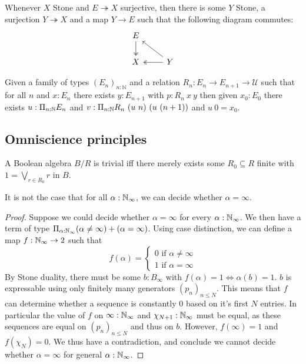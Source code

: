 \documentclass{../util/zariski-small}
\begin{document}
\begin{axiomNum}
  Whenever $X$ Stone and $E\twoheadrightarrow X$ surjective, then there is some $Y$ Stone,
    a surjection $Y \twoheadrightarrow X$ and a map $Y\to E$ such that the following diagram commutes:
    \begin{equation}\begin{tikzcd}
      E \arrow[d,""',two heads]\\
      X & \arrow[l, "", two heads] Y\arrow[lu, ""']
    \end{tikzcd}\end{equation}  
\end{axiomNum} 
\begin{axiomNum}\label{axDependentChoice}
  Given a family of types $(E_n)_{n:\mathbb N}$ and 
  a relation 
  $R_n:E_n\rightarrow E_{n+1}\rightarrow {\mathcal U}$ such that
  for all $n$ and $x:E_n$ there exists $y:E_{n+1}$ with $p:R_n~x~y$ 
  then given $x_0:E_0$ there exists
  $u:\Pi_{n:\mathbb{N}}E_n$ and $v:\Pi_{n:\mathbb{N}}R_n~(u~n)~(u~(n+1))$ and $u~0 = x_0$.
\end{axiomNum}
\subsection{Omniscience principles}
\begin{remark}\label{rmkTrivialBA}
  A Boolean algebra $B / R$ 
  is trivial iff there merely exists some $R_0\subseteq R$ finite with 
  $1 = \bigvee_{r \in R_0} r$ in $B$.
\end{remark}

\begin{theorem}
  It is not the case that for all $\alpha:\mathbb{N}_{\infty}$, we can decide whether $\alpha=\infty$.
\end{theorem}
\begin{proof}
  Suppose we could decide whether $\alpha = \infty$ for every $\alpha:\mathbb{N}_{\infty}$. We then have a term of type 
  $\Pi_{\alpha:\mathbb{N}_{\infty}} (\alpha \neq \infty) + (\alpha = \infty)$. 
  Using case distinction, we can define a map $f:\mathbb{N}_{\infty} \to 2$ such that 
  \begin{equation}
    f(\alpha) = \begin{cases} 0 \text{ if } \alpha \neq  \infty
    \\ 1 \text{ if } \alpha = \infty \end{cases} 
  \end{equation}
  By Stone duality, there must be some $b:B_\infty$ with 
  $f(\alpha) = 1 \iff \alpha(b) = 1$.
  $b$ is expressable using only finitely many generators $(p_n)_{n\leq N}$. 
  This means that $f$ can determine whether a sequence is constantly $0$ based on it's first $N$ entries. 
  In particular the value of $f$ on $\infty:\mathbb{N}_{\infty}$ and $\chi_{N+1}:\mathbb{N}_{\infty}$ must be equal, 
  as these sequences are equal on $(p_n)_{n\leq N}$ and thus on $b$. 
  However, $f(\infty) = 1$ and $f(\chi_N) = 0$. 
  We thus have a contradiction, and conclude we cannot decide whether $\alpha = \infty$ for general $\alpha:\mathbb{N}_{\infty}$. 
\end{proof}
\end{document}
